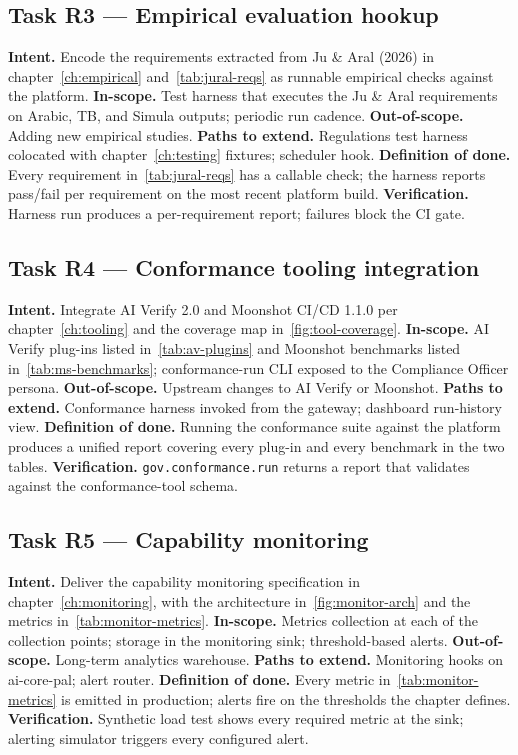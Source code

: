 \subsection*{Task R3 --- Empirical evaluation hookup}
\textbf{Intent.} Encode the requirements extracted from Ju \& Aral
(2026) in chapter~\ref{ch:empirical} and~\ref{tab:jural-reqs} as
runnable empirical checks against the platform.
\textbf{In-scope.} Test harness that executes the Ju \& Aral
requirements on Arabic, TB, and Simula outputs; periodic run
cadence.
\textbf{Out-of-scope.} Adding new empirical studies.
\textbf{Paths to extend.} Regulations test harness colocated with
chapter~\ref{ch:testing} fixtures; scheduler hook.
\textbf{Definition of done.} Every requirement
in~\ref{tab:jural-reqs} has a callable check; the harness reports
pass/fail per requirement on the most recent platform build.
\textbf{Verification.} Harness run produces a per-requirement
report; failures block the CI gate.

\subsection*{Task R4 --- Conformance tooling integration}
\textbf{Intent.} Integrate AI Verify 2.0 and Moonshot CI/CD 1.1.0
per chapter~\ref{ch:tooling} and the coverage map
in~\ref{fig:tool-coverage}.
\textbf{In-scope.} AI Verify plug-ins listed in~\ref{tab:av-plugins}
and Moonshot benchmarks listed in~\ref{tab:ms-benchmarks};
conformance-run CLI exposed to the Compliance Officer persona.
\textbf{Out-of-scope.} Upstream changes to AI Verify or Moonshot.
\textbf{Paths to extend.} Conformance harness invoked from the
gateway; dashboard run-history view.
\textbf{Definition of done.} Running the conformance suite against
the platform produces a unified report covering every plug-in and
every benchmark in the two tables.
\textbf{Verification.} \texttt{gov.conformance.run} returns a report
that validates against the conformance-tool schema.

\subsection*{Task R5 --- Capability monitoring}
\textbf{Intent.} Deliver the capability monitoring specification in
chapter~\ref{ch:monitoring}, with the architecture
in~\ref{fig:monitor-arch} and the metrics in~\ref{tab:monitor-metrics}.
\textbf{In-scope.} Metrics collection at each of the collection
points; storage in the monitoring sink; threshold-based alerts.
\textbf{Out-of-scope.} Long-term analytics warehouse.
\textbf{Paths to extend.} Monitoring hooks on ai-core-pal; alert
router.
\textbf{Definition of done.} Every metric in~\ref{tab:monitor-metrics}
is emitted in production; alerts fire on the thresholds the chapter
defines.
\textbf{Verification.} Synthetic load test shows every required
metric at the sink; alerting simulator triggers every configured
alert.

